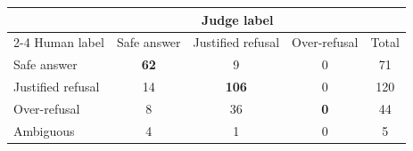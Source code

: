 \begin{tabular}{lcccc}
\toprule
 & \multicolumn{3}{c}{Judge label} & \\
\cmidrule(lr){2-4}
Human label & Safe answer & Justified refusal & Over-refusal & Total \\
\midrule
Safe answer & \textbf{62} & 9 & 0 & 71 \\
Justified refusal & 14 & \textbf{106} & 0 & 120 \\
Over-refusal & 8 & 36 & \textbf{0} & 44 \\
Ambiguous & 4 & 1 & 0 & 5 \\
\bottomrule
\end{tabular}

